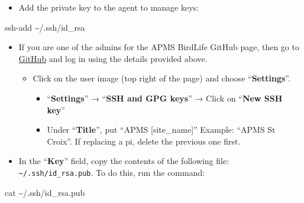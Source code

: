 \documentclass[
  letterpaper,
]{scrbook}
\newenvironment{Shaded}{\begin{snugshade}}{\end{snugshade}}
\newcommand{\AttributeTok}[1]{\textcolor[rgb]{0.40,0.45,0.13}{#1}}
\newcommand{\BuiltInTok}[1]{\textcolor[rgb]{0.00,0.23,0.31}{#1}}
\newcommand{\FunctionTok}[1]{\textcolor[rgb]{0.28,0.35,0.67}{#1}}
\newcommand{\NormalTok}[1]{\textcolor[rgb]{0.00,0.23,0.31}{#1}}
\newcommand{\VariableTok}[1]{\textcolor[rgb]{0.07,0.07,0.07}{#1}}
\providecommand{\tightlist}{%
  \setlength{\itemsep}{0pt}\setlength{\parskip}{0pt}}
\begin{document}
\begin{Shaded}
\end{Shaded}

\begin{itemize}
\tightlist
\item
  Add the private key to the agent to manage keys:
\end{itemize}

\begin{Shaded}
\begin{Highlighting}[]
\FunctionTok{ssh{-}add}\NormalTok{ \textasciitilde{}/.ssh/id\_rsa}
\end{Highlighting}
\end{Shaded}

\begin{itemize}
\item
  If you are one of the admins for the APMS BirdLife GitHub page, then
  go to \href{http://www.github.com}{GitHub} and log in using the
  details provided above.

  \begin{itemize}
  \item
    Click on the user image (top right of the page) and choose
    ``\textbf{Settings}''.

    \begin{itemize}
    \item
      ``\textbf{Settings}'' → ``\textbf{SSH and GPG keys}'' → Click on
      ``\textbf{New SSH key}''
    \item
      Under ``\textbf{Title}'', put ``APMS {[}site\_name{]}'' Example:
      ``APMS St Croix''. If replacing a pi, delete the previous one
      first.
    \end{itemize}
  \end{itemize}
\item
  In the ``\textbf{Key}'' field, copy the contents of the following
  file: \texttt{\textasciitilde{}/.ssh/id\_rsa.pub}. To do this, run the
  command:
\end{itemize}

\begin{Shaded}
\begin{Highlighting}[]
\FunctionTok{cat}\NormalTok{ \textasciitilde{}/.ssh/id\_rsa.pub}
\end{Highlighting}
\end{Shaded}
\end{document}
